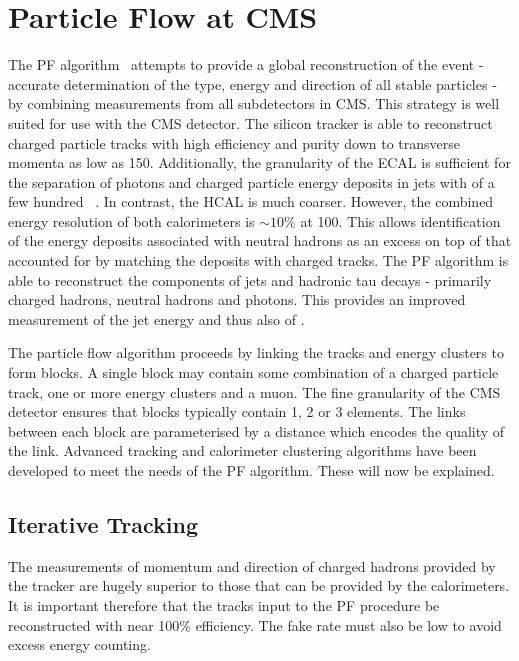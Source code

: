 \section{Particle Flow at \ac{CMS}}
\label{sec:reco_pf}
The \ac{PF} algorithm~\cite{cms_pf_pas, cms_pf_pas2} attempts to provide a
global reconstruction of the event - accurate determination of the type, energy
and direction of all stable particles - by combining measurements from all
subdetectors in \ac{CMS}. This strategy is well suited for use with the \ac{CMS}
detector. The silicon tracker is able to reconstruct charged particle tracks
with high efficiency and purity down to transverse momenta as low as
\unit{150}{\MeV}. Additionally, the granularity of the \ac{ECAL} is sufficient
for the separation of photons and charged particle energy deposits in jets with
\Pt of a few hundred \GeV~\cite{cms_pf_pas}. In contrast, the \ac{HCAL} is much
coarser. However, the combined energy resolution of both calorimeters is $\sim
10\%$ at \unit{100}{\GeV}. This allows identification of the energy deposits
associated with neutral hadrons as an excess on top of that accounted for by
matching the deposits with charged tracks. The \ac{PF} algorithm is able to
reconstruct the components of jets and hadronic tau decays - primarily charged
hadrons, neutral hadrons and photons. This provides an improved measurement of
the jet energy and thus also of \METv.

The particle flow algorithm proceeds by linking the tracks and energy clusters
to form blocks. A single block may contain some combination of a charged
particle track, one or more energy clusters and a muon. The fine granularity of
the \ac{CMS} detector ensures that blocks typically contain 1, 2 or 3 elements.
The links between each block are parameterised by a distance which encodes the
quality of the link. Advanced tracking and calorimeter clustering algorithms
have been developed to meet the needs of the \ac{PF} algorithm. These will now
be explained.

\subsection{Iterative Tracking}
The measurements of momentum and direction of charged hadrons provided by the
tracker are hugely superior to those that can be provided by the calorimeters.
It is important therefore that the tracks input to the \ac{PF} procedure be
reconstructed with near 100\% efficiency. The fake rate must also be low to
avoid excess energy counting.

